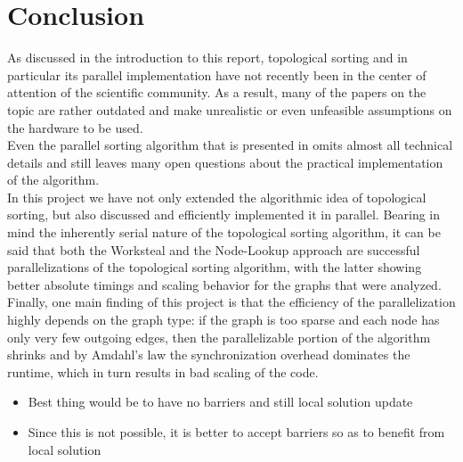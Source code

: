 \section{Conclusion}
%
As discussed in the introduction to this report, topological sorting and in particular its parallel implementation have not recently been in the center of attention of the scientific community.
As a result, many of the papers on the topic are rather outdated and make unrealistic or even unfeasible assumptions on the hardware to be used. \\
Even the parallel sorting algorithm that is presented in  \cite{er1983parallel} omits almost all technical details and still leaves many open questions about the practical implementation of the algorithm. \\
In this project we have not only extended the algorithmic idea of topological sorting, but also discussed and efficiently implemented it in parallel.
Bearing in mind the inherently serial nature of the topological sorting algorithm, it can be said that both the Worksteal and the Node-Lookup approach are successful parallelizations of the topological sorting algorithm, with the latter showing better absolute timings and scaling behavior for the graphs that were analyzed. \\
Finally, one main finding of this project is that the efficiency of the parallelization highly depends on the graph type: if the graph is too sparse and each node has only very few outgoing edges, then the parallelizable portion of the algorithm shrinks and by Amdahl's law the synchronization overhead dominates the runtime, which in turn results in bad scaling of the code. \\

\begin{invisible}
 \begin{itemize}
   \item Best thing would be to have no barriers and still local solution update
   \item Since this is not possible, it is better to accept barriers so as to benefit from local solution
 \end{itemize}
\end{invisible}
